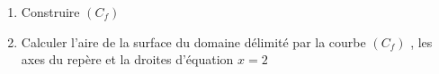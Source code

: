 \documentclass[12pt,a4paper]{report}
\begin{document}
\begin{exercise}
\begin{enumerate}
\item Construire  $(C_f)$ 
\item Calculer l'aire de la surface du domaine délimité par la courbe  $\left( C_f\right) $ , les axes du repère  et la droites d'équation  $x=2$
\end{enumerate}
	\end{exercise}
	
	


\end{document}
